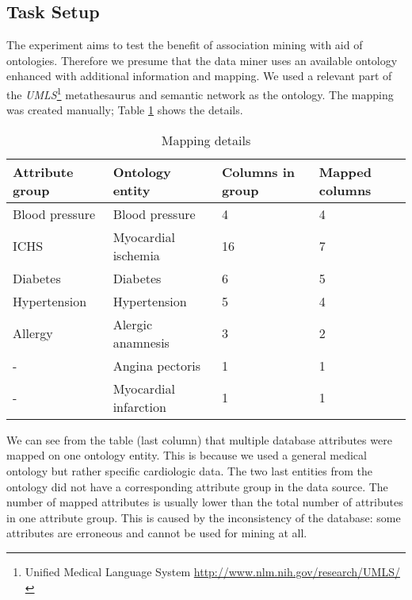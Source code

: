 \subsection{Task Setup}\label{Task}
The experiment aims to test the benefit of association mining with aid of ontologies. 
Therefore we presume that the data miner uses an available ontology enhanced with additional information and mapping. 
We used a relevant part of the \emph{UMLS}\footnote{Unified Medical Language System \url{http://www.nlm.nih.gov/research/UMLS/}} metathesaurus and semantic network as the ontology. 
The mapping was created manually; Table \ref{tab:Mapping} shows the details.

\begin{table}[ht]
	\centering
		\begin{tabular}{|p{}|p{}|p{}|p{}|}
			\hline
			\textbf{Attribute group} & \textbf{Ontology entity} & \textbf{Columns in group} & \textbf{Mapped columns}\\
			\hline
			Blood pressure & Blood pressure & 4 & 4 \\
			\hline
			ICHS & Myocardial ischemia & 16 & 7 \\
			\hline
			Diabetes & Diabetes & 6 & 5 \\
			\hline
			Hypertension & Hypertension & 5 & 4 \\
			\hline
			Allergy & Alergic anamnesis & 3 & 2 \\
			\hline
			 - & Angina pectoris & 1 & 1 \\
			\hline
			 - & Myocardial infarction & 1 & 1 \\
			 \hline
		\end{tabular}
	\caption{Mapping details}
	\label{tab:Mapping}
\end{table}

We can see from the table (last column) that multiple database attributes were mapped on one ontology entity. 
This is because we used a general medical ontology but rather specific cardiologic data. 
The two last entities from the ontology did not have a corresponding attribute group in the data source. 
The number of mapped attributes is usually lower than the total number of attributes in one attribute group. 
This is caused by the inconsistency of the database: some attributes are erroneous and cannot be used for mining at all. 

